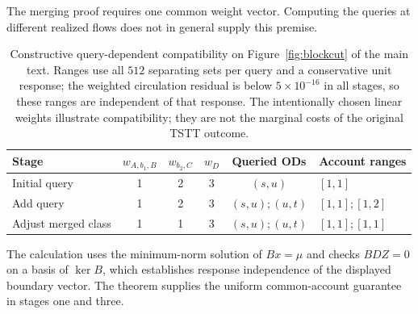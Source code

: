 \begin{rmk}\label{rmk:quantifier}
The merging proof requires one common weight vector. Computing the
queries at different realized flows does not in general supply this
premise.
\end{rmk}

\begin{table}[pos=tb]
\footnotesize
\caption{Constructive query-dependent compatibility on Figure~\ref{fig:blockcut}
of the main text. Ranges use all $512$ separating sets per query and a
conservative unit response; the weighted circulation residual is below
$5\times10^{-16}$ in all stages, so these ranges are independent of that
response. The intentionally chosen linear weights illustrate
compatibility; they are not the marginal costs of the original TSTT
outcome.}\label{tab:topologyexample}
\begin{tabular*}{\tblwidth}{@{\extracolsep{\fill}}lccccl}
\toprule Stage & $w_{A,b_1,B}$ & $w_{b_2,C}$ & $w_D$ & Queried ODs & Account ranges\\\midrule
Initial query & 1 & 2 & 3 & $(s,u)$ & $[1,1]$\\
Add query & 1 & 2 & 3 & $(s,u);(u,t)$ & $[1,1];[1,2]$\\
Adjust merged class & 1 & 1 & 3 & $(s,u);(u,t)$ & $[1,1];[1,1]$\\
\bottomrule\end{tabular*}\end{table}
The calculation uses the minimum-norm solution of $Bx=\mu$ and checks
$BDZ=0$ on a basis of $\ker B$, which establishes response independence
of the displayed boundary vector. The theorem supplies the uniform
common-account guarantee in stages one and three.

